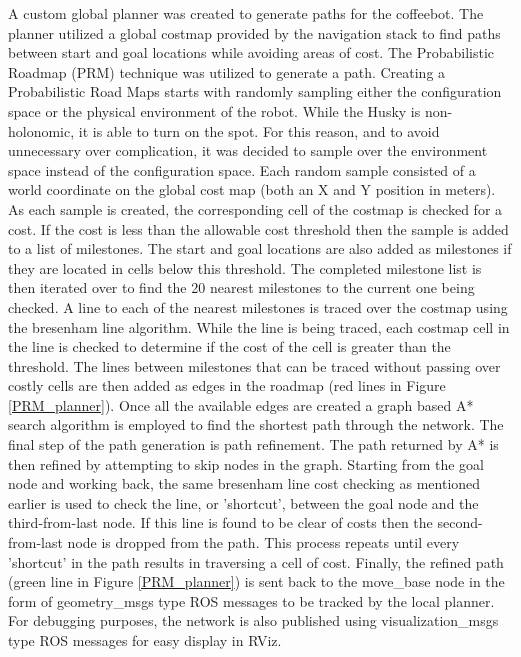\documentclass[letterpaper, 10 pt, conference]{ieeeconf}  %
\begin{document}
A custom global planner was created to generate paths for the coffeebot. The planner utilized a global costmap provided by the navigation stack to find paths between start and goal locations while avoiding areas of cost. The Probabilistic Roadmap (PRM) technique was utilized to generate a path. Creating a Probabilistic Road Maps starts with randomly sampling either the configuration space or the physical environment of the robot. While the Husky is non-holonomic, it is able to turn on the spot. For this reason, and to avoid unnecessary over complication, it was decided to sample over the environment space instead of the configuration space. Each random sample consisted of a world coordinate on the global cost map (both an X and Y position in meters). As each sample is created, the corresponding cell of the costmap is checked for a cost. If the cost is less than the allowable cost threshold then the sample is added to a list of milestones. The start and goal locations are also added as milestones if they are located in cells below this threshold. The completed milestone list is then iterated over to find the 20 nearest milestones to the current one being checked. A line to each of the nearest milestones is traced over the costmap using the bresenham line algorithm. While the line is being traced, each costmap cell in the line is checked to determine if the cost of the cell is greater than the threshold. The lines between milestones that can be traced without passing over costly cells are then added as edges in the roadmap (red lines in Figure \ref{PRM_planner}). Once all the available edges are created a graph based A* search algorithm is employed to find the shortest path through the network. The final step of the path generation is path refinement. The path returned by A* is then refined by attempting to skip nodes in the graph. Starting from the goal node and working back, the same bresenham line cost checking as mentioned earlier is used to check the line, or 'shortcut', between the goal node and the third-from-last node. If this line is found to be clear of costs then the second-from-last node is dropped from the path. This process repeats until every 'shortcut' in the path results in traversing a cell of cost.
Finally, the refined path (green line in Figure \ref{PRM_planner}) is sent back to the move\_base node in the form of geometry\_msgs type ROS messages to be tracked by the local planner. For debugging purposes, the network is also published using visualization\_msgs type ROS messages for easy display in RViz.
\end{document}
